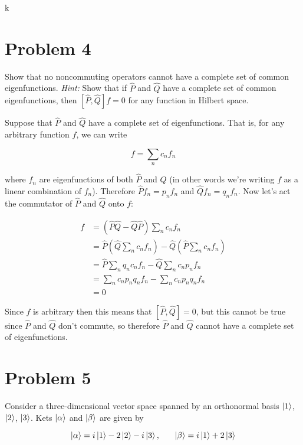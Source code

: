 \documentclass[10pt]{article}
\begin{document}
    k

    \section*{Problem 4}

    Show that no noncommuting operators cannot have a complete set of common eigenfunctions. \textit{Hint:} Show that if $\hat P$ and $\hat Q$ have a complete set of common eigenfunctions, then $[\hat P, \hat Q] f = 0$ for any function in Hilbert space.


    \begin{solution}
        Suppose that $\hat P$ and $\hat Q$ have a complete set of eigenfunctions. That is, for any arbitrary function $f$, we can write

        \[ f = \sum_n c_n f_n\] 

        where $f_n$ are eigenfunctions of both $\hat P$ and $\hat Q$ (in other words we're writing $f$ as a linear combination of $f_n$). Therefore $\hat P f_n = p_n f_n$ and $\hat Q f_n = q_n f_n$. Now let's act the commutator of $\hat P$ and $\hat Q$ onto $f$: 


        \begin{align*}
            [\hat P, \hat Q]f &= (\hat P \hat Q - \hat Q \hat P) \sum_n c_n f_n\\
            &= \hat P (\hat Q \sum_n c_n f_n) - \hat Q (\hat P\sum_n c_n f_n) \\
            &= \hat P \sum_n q_n c_n f_n - \hat Q \sum_n c_n p_n f_n\\
            &= \sum_n c_n p_n q_n f_n - \sum_n c_n p_n q_n f_n\\
            &= 0
        \end{align*}

        Since $f$ is arbitrary then this means that $[\hat P, \hat Q] = 0$, but this cannot be true since $\hat P$ and $\hat Q$ don't commute, so therefore $\hat P$ and $\hat Q$ cannot have a complete set of eigenfunctions.
    \end{solution}

    \pagebreak
    \section*{Problem 5}

    Consider a three-dimensional vector space spanned by an orthonormal basis $\ket{1}$, $\ket 2$, $\ket 3$. Kets $\ket \alpha$ and $\ket \beta$ are given by 

    \[ \ket \alpha = i \ket 1 - 2\ket 2 - i\ket 3, \phantom{aaa} \ket \beta = i\ket 1 + 2\ket 3\] 
\end{document}
